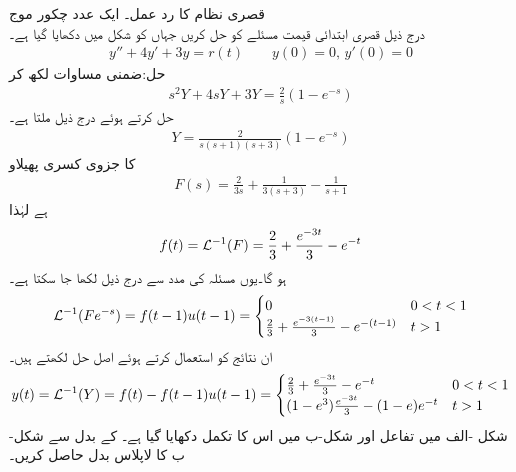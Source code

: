 \quad قصری نظام کا رد عمل۔ ایک عدد چکور موج\\
درج ذیل قصری ابتدائی قیمت مسئلے کو حل کریں جہاں  کو شکل  میں دکھایا گیا ہے۔
\begin{align*}
y''+4y'+3y=r(t) \quad \quad y(0)=0, \, y'(0)=0
\end{align*}
حل:ضمنی مساوات لکھ کر
\begin{align*}
s^2Y+4sY+3Y=\frac{2}{s}(1-e^{-s})
\end{align*}
حل کرتے ہوئے درج ذیل ملتا ہے۔
\begin{align*}
Y=\frac{2}{s(s+1)(s+3)}(1-e^{-s})
\end{align*}
 کا جزوی کسری پھیلاو 
\begin{align*}
F(s)=\frac{2}{3s}+\frac{1}{3(s+3)}-\frac{1}{s+1}
\end{align*}
  ہے لہٰذا
\begin{align*}
f(t)=\mathcal{L}^{-1}(F)=\frac{2}{3}+\frac{e^{-3t}}{3}-e^{-t}
\end{align*}
ہو گا۔یوں مسئلہ  کی مدد سے درج ذیل لکھا جا سکتا ہے۔
\begin{align*}
\mathcal{L}^{-1}(Fe^{-s})=f(t-1)u(t-1)=
\begin{cases}
0& 0<t<1\\
\frac{2}{3}+\frac{e^{-3(t-1)}}{3}-e^{-(t-1)} & t>1
\end{cases}
\end{align*}
ان نتائج کو استعمال کرتے ہوئے اصل حل لکھتے ہیں۔
\begin{align*}
y(t)=\mathcal{L}^{-1}(Y)=f(t)-f(t-1)u(t-1)=
\begin{cases}
\frac{2}{3}+\frac{e^{-3t}}{3}-e^{-t} & 0<t<1\\
(1-e^3)\frac{e^{-3t}}{3}-(1-e)e^{-t}& t>1
\end{cases}
\end{align*}
شکل -الف میں تفاعل  اور شکل-ب میں اس کا تکمل دکھایا گیا ہے۔ کے بدل سے  شکل-ب کا لاپلاس بدل حاصل کریں۔
